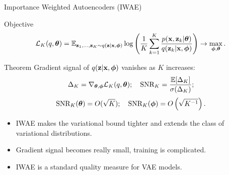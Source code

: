 \begin{frame}{Importance Weighted Autoencoders (IWAE)}
	\begin{block}{Objective}
		\vspace{-0.7cm}
		\[
		\mathcal{L}_K (q, \boldsymbol{\theta})  = \mathbb{E}_{\mathbf{z}_1, \dots, \mathbf{z}_K \sim q(\mathbf{z} | \mathbf{x}, \boldsymbol{\phi})} \log \left( \frac{1}{K}\sum_{k=1}^K\frac{p(\mathbf{x}, \mathbf{z}_k | \boldsymbol{\theta})}{q(\mathbf{z}_k| \mathbf{x}, \boldsymbol{\phi})} \right) \rightarrow \max_{\boldsymbol{\phi}, \boldsymbol{\theta}}.
		\]
		\vspace{-0.5cm}
	\end{block}
	\begin{block}{Theorem}
		Gradient signal of $q(\mathbf{z} | \mathbf{x}, \boldsymbol{\phi})$ vanishes as $K$ increases:
		\vspace{-0.3cm}
		\[
		\Delta_K = \nabla_{\boldsymbol{\theta}, \boldsymbol{\phi}} \mathcal{L}_K (q, \boldsymbol{\theta}); \quad
		\text{SNR}_K = \frac{\mathbb{E} [\Delta_K]}{\sigma(\Delta_K)};
		\]
		\vspace{-0.3cm}
		\[
			\text{SNR}_K(\boldsymbol{\theta}) = O(\sqrt{K}); \quad 
			\text{SNR}_K(\boldsymbol{\phi}) = O\left(\sqrt{K^{-1}}\right).
		\]
	\end{block}
	\begin{itemize}
		\item IWAE makes the variational bound tighter and extends the class of variational distributions.
		\item Gradient signal becomes really small, training is complicated.
		\item IWAE is a standard quality measure for VAE models.
	\end{itemize}
\end{frame}
